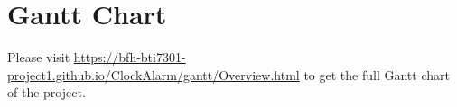 \section{Gantt Chart}

Please visit
\url{https://bfh-bti7301-project1.github.io/ClockAlarm/gantt/Overview.html} to
get the full Gantt chart of the project.
